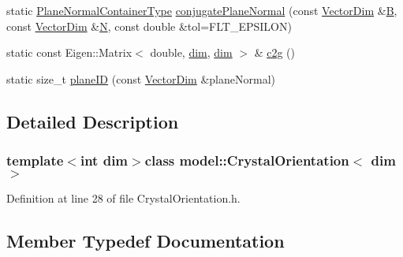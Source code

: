\begin{DoxyCompactItemize}
\item 
static \hyperlink{classmodel_1_1_crystal_orientation_a55ae599a60a13e109c1445889b42f87b}{Plane\+Normal\+Container\+Type} \hyperlink{classmodel_1_1_crystal_orientation_aeea7c7029ad0d508168a26c61351f59f}{conjugate\+Plane\+Normal} (const \hyperlink{classmodel_1_1_crystal_orientation_a32108cd454d481e0e57a0d2801d2adaa}{Vector\+Dim} \&\hyperlink{plot_stress_strain_8m_a9d3d9048db16a7eee539e93e3618cbe7}{B}, const \hyperlink{classmodel_1_1_crystal_orientation_a32108cd454d481e0e57a0d2801d2adaa}{Vector\+Dim} \&\hyperlink{thompson__tetrahedron_8m_a7823765a845eb81829f110d8337f81ae}{N}, const double \&tol=F\+L\+T\+\_\+\+E\+P\+S\+I\+L\+O\+N)
\item 
static const Eigen\+::\+Matrix$<$ double, \hyperlink{plot_nd_a_8m_a382f3ca768b275b8d563604f7fc7df73}{dim}, \hyperlink{plot_nd_a_8m_a382f3ca768b275b8d563604f7fc7df73}{dim} $>$ \& \hyperlink{classmodel_1_1_crystal_orientation_ad8a34d262aad0ad07a251dd9fc9f6e8b}{c2g} ()
\item 
static size\+\_\+t \hyperlink{classmodel_1_1_crystal_orientation_a7b5fff0ecbcbdd0da9b930e09ed072f0}{plane\+I\+D} (const \hyperlink{classmodel_1_1_crystal_orientation_a32108cd454d481e0e57a0d2801d2adaa}{Vector\+Dim} \&plane\+Normal)
\end{DoxyCompactItemize}


\subsection{Detailed Description}
\subsubsection*{template$<$int dim$>$class model\+::\+Crystal\+Orientation$<$ dim $>$}



Definition at line 28 of file Crystal\+Orientation.\+h.



\subsection{Member Typedef Documentation}
\hypertarget{classmodel_1_1_crystal_orientation_a55ae599a60a13e109c1445889b42f87b}{}
